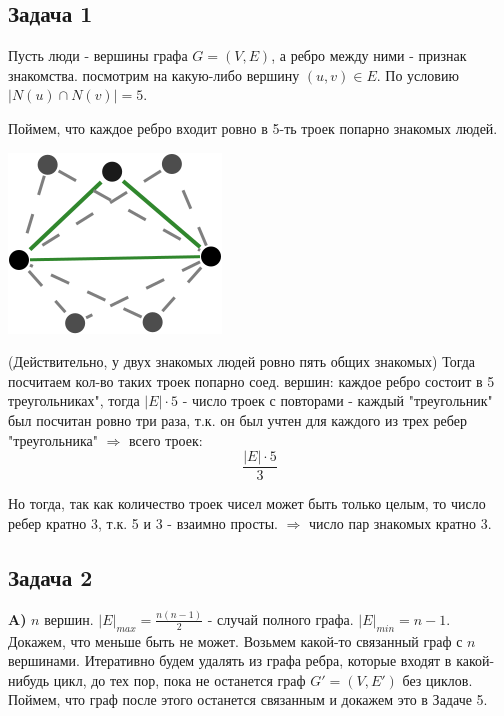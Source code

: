 \documentclass{article}
\begin{document}
\begin{center}
	\subsection*{Задача 1}
\end{center}

Пусть люди - вершины графа $ G = (V, E) $, а ребро между ними - признак знакомства.
посмотрим на какую-либо вершину $ (u, v) \in E $. По условию $ |N(u) \cap N(v)| = 5$.

Поймем, что каждое ребро входит ровно в 5-ть троек попарно знакомых людей.

\includegraphics[scale=0.5]{1_1.png}

(Действительно, у двух знакомых людей ровно пять общих знакомых)
Тогда посчитаем кол-во таких троек попарно соед. вершин: каждое ребро состоит в 5 треугольниках", тогда $|E| \cdot 5$ - число троек с повторами - каждый "треугольник" был посчитан ровно три раза, т.к. он был учтен для каждого из трех ребер "треугольника" $\Rightarrow$ всего троек:
$$ \frac{|E| \cdot 5}{3}$$

Но тогда, так как количество троек чисел может быть только целым, то число ребер кратно 3, т.к. 5 и 3 - взаимно просты. $ \Rightarrow $ число пар знакомых кратно 3.   
 
 \begin{center}
 	\subsection*{Задача 2}
 \end{center}
 
 \textbf{A)} $ n $ вершин. $ |E|_{max} = \frac{n(n - 1)}{2} $ - случай полного графа.
 $ |E|_{min} = n - 1 $. Докажем, что меньше быть не может.
 Возьмем какой-то связанный граф с $ n $ вершинами. Итеративно будем удалять из графа ребра, которые входят в какой-нибудь цикл, до тех пор, пока не останется граф $ G' = (V, E') $ без циклов. Поймем, что граф после этого останется связанным и докажем это в Задаче 5.
 
\end{document}
